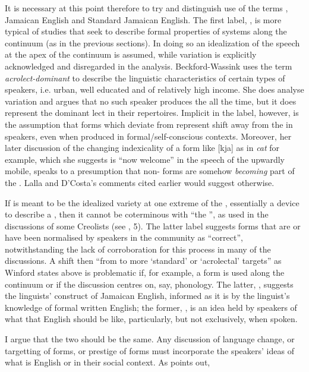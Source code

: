   It is necessary at this point therefore to try and distinguish use of the terms , Jamaican English and Standard Jamaican English.  The first label, , is more typical of studies that seek to describe formal properties of systems along the continuum (as in the previous sections).  In doing so an idealization of the speech at the apex of the continuum is assumed, while variation is explicitly acknowledged and disregarded in the analysis.  Beckford-Wassink uses the term \textit{acrolect-dominant} to describe the linguistic characteristics of certain types of speakers, i.e. urban, well educated and of relatively high income.  She does analyse variation and argues that no such speaker produces the  all the time, but it does represent the dominant lect in their repertoires.  Implicit in the label, however, is the assumption that forms which deviate from  represent shift away from the  in speakers, even when produced in formal\slash self-conscious contexts.  Moreover, her later discussion of the changing indexicality of a form like [kja] as in \textit{cat} for example, which she suggests is “now welcome” \citep[31]{DyerBeckford2001} in the speech of the upwardly mobile, speaks to a presumption that non- forms are somehow \textit{becoming} part of the .  Lalla and D’Costa’s comments cited earlier would suggest otherwise.  

  If  is meant to be the idealized variety at one extreme of the , essentially a device to describe a , then it cannot be coterminous with “the ”, as used in the discussions of some Creolists (see , 5).  The latter label suggests forms that are or have been normalised by speakers in the community as “correct”, notwithstanding the lack of corroboration for this process in many of the discussions.  A shift then “from  to more ‘standard’ or ‘acrolectal’ targets” as Winford states above is problematic if, for example, a form is used along the continuum or if the discussion centres on, say, phonology.  The latter, , suggests the linguists’ construct of Jamaican English, informed as it is by the linguist’s knowledge of formal written English; the former, , is an idea held by speakers of what that English should be like, particularly, but not exclusively, when spoken.  

I argue that the two should be the same.  Any discussion of language change, or targetting of forms, or prestige of forms must incorporate the speakers’ ideas of what is English or  in their social context.  As \citet[119--120]{Shields1987} points out, 

